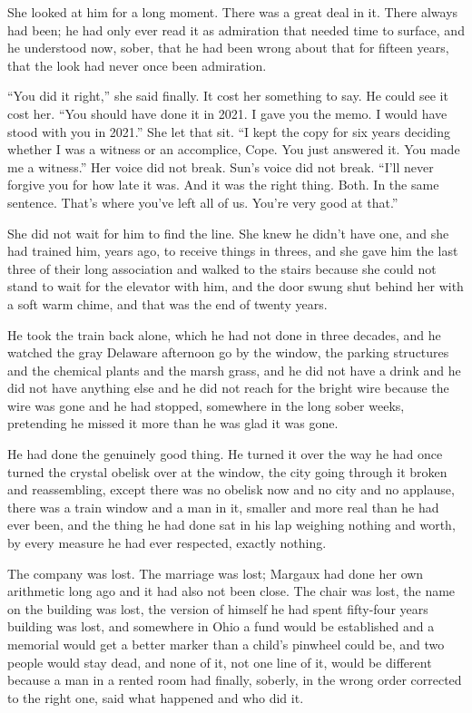\documentclass[11pt,openany]{book}
\newcommand{\scenebreak}{\par\vspace{0.5\baselineskip}\begin{center}\textasteriskcentered\quad\textasteriskcentered\quad\textasteriskcentered\end{center}\vspace{0.5\baselineskip}\par}
\begin{document}
She looked at him for a long moment. There was a great deal in it. There always had been; he had only ever read it as admiration that needed time to surface, and he understood now, sober, that he had been wrong about that for fifteen years, that the look had never once been admiration.

``You did it right,'' she said finally. It cost her something to say. He could see it cost her. ``You should have done it in 2021. I gave you the memo. I would have stood with you in 2021.'' She let that sit. ``I kept the copy for six years deciding whether I was a witness or an accomplice, Cope. You just answered it. You made me a witness.'' Her voice did not break. Sun's voice did not break. ``I'll never forgive you for how late it was. And it was the right thing. Both. In the same sentence. That's where you've left all of us. You're very good at that.''

She did not wait for him to find the line. She knew he didn't have one, and she had trained him, years ago, to receive things in threes, and she gave him the last three of their long association and walked to the stairs because she could not stand to wait for the elevator with him, and the door swung shut behind her with a soft warm chime, and that was the end of twenty years.


\scenebreak


He took the train back alone, which he had not done in three decades, and he watched the gray Delaware afternoon go by the window, the parking structures and the chemical plants and the marsh grass, and he did not have a drink and he did not have anything else and he did not reach for the bright wire because the wire was gone and he had stopped, somewhere in the long sober weeks, pretending he missed it more than he was glad it was gone.

He had done the genuinely good thing. He turned it over the way he had once turned the crystal obelisk over at the window, the city going through it broken and reassembling, except there was no obelisk now and no city and no applause, there was a train window and a man in it, smaller and more real than he had ever been, and the thing he had done sat in his lap weighing nothing and worth, by every measure he had ever respected, exactly nothing.

The company was lost. The marriage was lost; Margaux had done her own arithmetic long ago and it had also not been close. The chair was lost, the name on the building was lost, the version of himself he had spent fifty-four years building was lost, and somewhere in Ohio a fund would be established and a memorial would get a better marker than a child's pinwheel could be, and two people would stay dead, and none of it, not one line of it, would be different because a man in a rented room had finally, soberly, in the wrong order corrected to the right one, said what happened and who did it.
\end{document}
